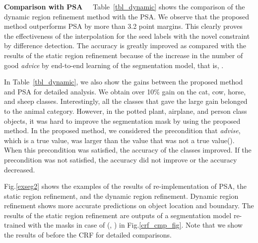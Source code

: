 \documentclass[10pt,twocolumn,letterpaper]{article}
\begin{document}
\noindent
{\bf Comparison with PSA~~}
Table~\ref{tbl_dynamic} shows the comparison of the dynamic region refinement method with the PSA.
We observe that the proposed method outperforms PSA by more than 3.2 point margins.
This clearly proves the effectiveness of the interpolation for the seed labels with the novel constraint by difference detection.
The accuracy is greatly improved as compared with the results of the static region refinement because of the increase in the number of good {\it advice} by end-to-end learning of the segmentation model, that is, .

In Table~\ref{tbl_dynamic}, we also show the gains between the proposed method and PSA for detailed analysis.
We obtain over 10\% gain on the cat, cow, horse, and sheep classes.
Interestingly, all the classes that gave the large gain belonged to the animal category.
However, in the potted plant, airplane, and person class objects, it was hard to improve the segmentation mask by using the proposed method.
In the proposed method, we considered the precondition that {\it advise}, which is a true value, was larger than the value that was not a true value().
When this precondition was satisfied, the accuracy of the classes improved.
If the precondition was not satisfied, the accuracy did not improve or the accuracy decreased.

Fig.\ref{exseg2} shows the examples of the results of re-implementation of PSA, the static region refinement, and the dynamic region refinement.
Dynamic region refinement shows more accurate predictions on object location and
boundary.
The results of the static region refinement are outputs of a segmentation model re-trained with the masks in case of (, ) in Fig.\ref{crf_cmp_fig}.
Note that we show the results of before the CRF for detailed comparisons.
\end{document}
